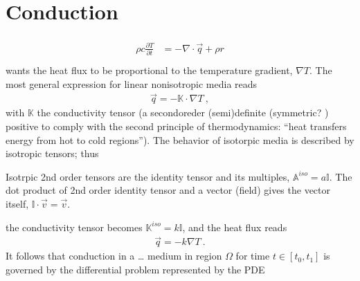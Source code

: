 \documentclass[letterpaper,10pt,english]{jupyterBook}
\begin{document}
\section{Conduction}
\label{\detokenize{ch/heat-transfer-conduction:conduction}}\label{\detokenize{ch/heat-transfer-conduction:classical-thermodynamics-heat-transmission-conduction}}\label{\detokenize{ch/heat-transfer-conduction::doc}}\begin{equation*}
\begin{split}\begin{aligned}
  \rho c \frac{\partial T}{\partial t}
  & = - \nabla \cdot \vec{q} + \rho r \\
\end{aligned}\end{split}
\end{equation*}
\sphinxAtStartPar
{} wants the heat flux to be proportional to the temperature gradient, \(\nabla T\). The most general expression for linear non\sphinxhyphen{}isotropic media reads
\begin{equation*}
\begin{split}\vec{q} = - \mathbb{K} \cdot \nabla T \ ,\end{split}
\end{equation*}
\sphinxAtStartPar
with \(\mathbb{K}\) the conductivity tensor (a second\sphinxhyphen{}oreder (semi)definite (symmetric?  ) positive to comply with the second principle of thermodynamics: “heat transfers energy from hot to cold regions”). The behavior of isotorpic media is described by isotropic tensors; thus%
\begin{footnote}[1]\sphinxAtStartFootnote
Isotrpic 2\sphinxhyphen{}nd order tensors are the identity tensor and its multiples, \(\mathbb{A}^{iso} = a \mathbb{I}\). The dot product of 2\sphinxhyphen{}nd order identity tensor and a vector (field) gives the vector itself, \(\mathbb{I} \cdot  \vec{v} = \vec{v}\).
%
\end{footnote} the conductivity tensor becomes \(\mathbb{K}^{iso} = k \mathbb{I}\), and the heat flux reads
\begin{equation*}
\begin{split}\vec{q} = - k \nabla T \ .\end{split}
\end{equation*}
\sphinxAtStartPar
{} It follows that conduction in a … medium in region \(\Omega\) for time \(t \in [t_0, t_1]\) is governed by the differential problem represented by the PDE
\end{document}
